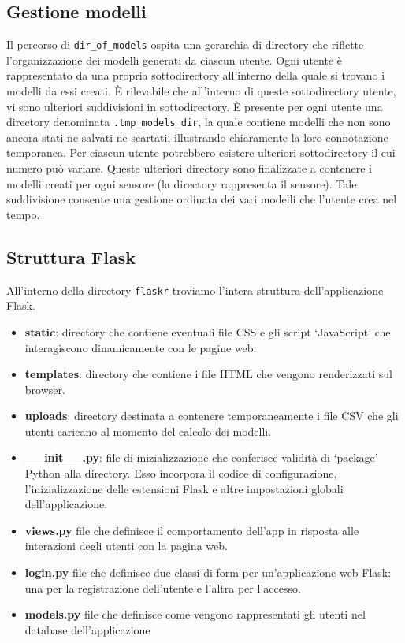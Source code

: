 \documentclass[a4paper,10pt]{article}
\begin{document}
\subsection{Gestione modelli}
Il percorso di \texttt{dir\_of\_models} ospita una gerarchia di directory che riflette l'organizzazione dei modelli generati da ciascun utente. 
Ogni utente è rappresentato da una propria sottodirectory all'interno della quale si trovano i modelli da essi creati. 
È rilevabile che all'interno di queste sottodirectory utente, vi sono ulteriori suddivisioni in sottodirectory. È presente per ogni utente
una directory denominata \texttt{.tmp\_models\_dir}, la quale contiene modelli che non sono ancora stati ne salvati ne scartati, illustrando chiaramente
la loro connotazione temporanea. Per ciascun utente potrebbero esistere ulteriori sottodirectory il cui numero può variare.
Queste ulteriori directory sono finalizzate a contenere i modelli creati per ogni sensore (la directory rappresenta il sensore).
Tale suddivisione consente una gestione ordinata dei vari modelli che l'utente crea nel tempo.

\subsection{Struttura Flask}
All'interno della directory \texttt{flaskr} troviamo l'intera struttura dell'applicazione Flask.
\begin{itemize}
  \item \textbf{static}: directory che contiene eventuali file CSS e gli script `JavaScript' che interagiscono dinamicamente con le pagine web.
  \item \textbf{templates}: directory che contiene i file HTML che vengono renderizzati sul browser.
  \item \textbf{uploads}: directory destinata a contenere temporaneamente i file CSV che gli utenti caricano al momento del calcolo dei modelli.
  \item \textbf{\_\_init\_\_.py}: file di inizializzazione che conferisce validità di `package' Python alla directory. 
  Esso incorpora il codice di configurazione, l'inizializzazione delle estensioni Flask e altre impostazioni globali dell'applicazione.
  \item \textbf{views.py} file che definisce il comportamento dell'app in risposta alle interazioni degli utenti con la pagina web.
  \item \textbf{login.py} file che definisce due classi di form per un'applicazione web Flask: una per la registrazione dell'utente e l'altra per l'accesso.
  \item \textbf{models.py} file che definisce come vengono rappresentati gli utenti nel database dell'applicazione
\end{itemize}
\end{document}
